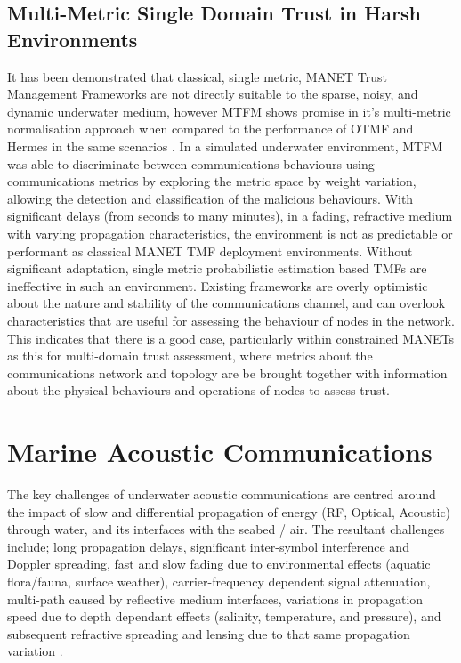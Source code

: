 \documentclass{aamas2016}
\begin{document}
\subsection{Multi-Metric Single Domain Trust in Harsh Environments}

It has been demonstrated that classical, single metric, MANET Trust Management Frameworks are not directly suitable to the sparse, noisy, and dynamic underwater medium, however MTFM shows promise in it's multi-metric normalisation approach when compared to the performance of OTMF and Hermes in the same scenarios \cite{Bolster2015b}.
In a simulated underwater environment, MTFM was able to discriminate between communications behaviours using communications metrics by exploring the metric space by weight variation, allowing the detection and classification of the malicious behaviours.
With significant delays (from seconds to many minutes), in a fading, refractive medium with varying propagation characteristics, the environment is not as predictable or performant as classical MANET TMF deployment environments. 
Without significant adaptation, single metric probabilistic estimation based TMFs are ineffective in such an environment.
Existing frameworks are overly optimistic about the nature and stability of the communications channel, and can overlook characteristics that are useful for assessing the behaviour of nodes in the network. 
This indicates that there is a good case, particularly within constrained MANETs as this for multi-domain trust assessment, where metrics about the communications network and topology are be brought together with information about the physical behaviours and operations of nodes to assess trust.




\section{Marine Acoustic Communications}

The key challenges of underwater acoustic communications are centred around the impact of slow and differential propagation of energy (RF, Optical, Acoustic) through water, and its interfaces with the seabed / air.
The resultant challenges include; long propagation delays, significant inter-symbol interference and Doppler spreading, fast and slow fading due to environmental effects (aquatic flora/fauna, surface weather), carrier-frequency dependent signal attenuation, multi-path caused by reflective medium interfaces, variations in propagation speed due to depth dependant effects (salinity, temperature, and pressure), and subsequent refractive spreading and lensing due to that same propagation variation \cite{Partan2006}.
\end{document}
